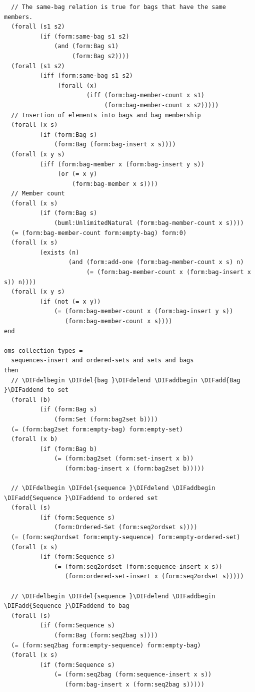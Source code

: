 \documentclass[10pt,fleqn,final]{scrreprt}
\newenvironment{definitions}[0]{\medskip }{}
\providecommand{\DIFadd}[1]{{\protect\color{blue}\uwave{#1}}} %
\providecommand{\DIFdel}[1]{{\protect\color{red}\sout{#1}}}                      %
\providecommand{\DIFaddbegin}{} %
\providecommand{\DIFaddend}{} %
\providecommand{\DIFdelbegin}{} %
\providecommand{\DIFdelend}{} %
\begin{document}
\begin{definitions}
\begin{lstlisting}
  // The same-bag relation is true for bags that have the same members.
  (forall (s1 s2)
          (if (form:same-bag s1 s2)
              (and (form:Bag s1)
                   (form:Bag s2))))
  (forall (s1 s2)
          (iff (form:same-bag s1 s2)
               (forall (x)
                       (iff (form:bag-member-count x s1)
                            (form:bag-member-count x s2)))))
  // Insertion of elements into bags and bag membership
  (forall (x s)
          (if (form:Bag s)
              (form:Bag (form:bag-insert x s))))
  (forall (x y s)
          (iff (form:bag-member x (form:bag-insert y s))
               (or (= x y)
                   (form:bag-member x s))))
  // Member count
  (forall (x s)
          (if (form:Bag s)
              (buml:UnlimitedNatural (form:bag-member-count x s))))
  (= (form:bag-member-count form:empty-bag) form:0)
  (forall (x s)
          (exists (n)
                  (and (form:add-one (form:bag-member-count x s) n)
                       (= (form:bag-member-count x (form:bag-insert x s)) n))))
  (forall (x y s)
          (if (not (= x y))
              (= (form:bag-member-count x (form:bag-insert y s))
                 (form:bag-member-count x s))))
end

oms collection-types =
  sequences-insert and ordered-sets and sets and bags
then
  // \DIFdelbegin \DIFdel{bag }\DIFdelend \DIFaddbegin \DIFadd{Bag }\DIFaddend to set
  (forall (b)
          (if (form:Bag s)
              (form:Set (form:bag2set b))))
  (= (form:bag2set form:empty-bag) form:empty-set)
  (forall (x b)
          (if (form:Bag b)
              (= (form:bag2set (form:set-insert x b))
                 (form:bag-insert x (form:bag2set b)))))

  // \DIFdelbegin \DIFdel{sequence }\DIFdelend \DIFaddbegin \DIFadd{Sequence }\DIFaddend to ordered set
  (forall (s)
          (if (form:Sequence s)
              (form:Ordered-Set (form:seq2ordset s))))
  (= (form:seq2ordset form:empty-sequence) form:empty-ordered-set)
  (forall (x s)
          (if (form:Sequence s)
              (= (form:seq2ordset (form:sequence-insert x s))
                 (form:ordered-set-insert x (form:seq2ordset s)))))

  // \DIFdelbegin \DIFdel{sequence }\DIFdelend \DIFaddbegin \DIFadd{Sequence }\DIFaddend to bag
  (forall (s)
          (if (form:Sequence s)
              (form:Bag (form:seq2bag s))))
  (= (form:seq2bag form:empty-sequence) form:empty-bag)
  (forall (x s)
          (if (form:Sequence s)
              (= (form:seq2bag (form:sequence-insert x s))
                 (form:bag-insert x (form:seq2bag s)))))


\end{lstlisting}
\end{definitions}
\end{document}
